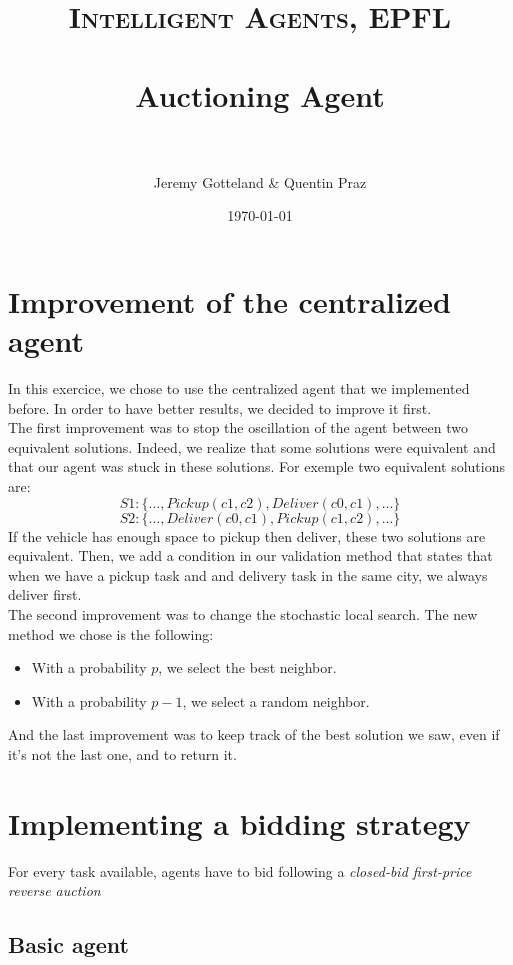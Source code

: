 \documentclass[fontsize=12pt]{scrartcl} %
\title{	
\normalfont \normalsize 
\textsc{Intelligent Agents, EPFL} \\ [20pt] %
\horrule{0.5pt} \\[0.4cm] %
\huge Auctioning Agent \\ %
\horrule{2pt} \\[0.5cm] %
}
\author{Jeremy Gotteland \& Quentin Praz} %
\date{\normalsize\today} %
\begin{document}
\maketitle %


\section*{Improvement of the centralized agent}

In this exercice, we chose to use the centralized agent that we implemented before. In order to have better results, we decided to improve it first.\\
The first improvement was to stop the oscillation of the agent between two equivalent solutions. Indeed, we realize that some solutions were equivalent and that our agent was stuck in these solutions. For exemple two equivalent solutions are:
$$S1: \{..., Pickup(c1, c2), Deliver(c0, c1),...\}$$ 
$$S2: \{..., Deliver(c0, c1), Pickup(c1, c2),...\}$$
If the vehicle has enough space to pickup then deliver, these two solutions are equivalent. Then, we add a condition in our validation method that states that when we have a pickup task and and delivery task in the same city, we always deliver first.\\
The second improvement was to change the stochastic local search. The new method we chose is the following:
\begin{itemize}
\item With a probability $p$, we select the best neighbor.
\item With a probability $p-1$, we select a random neighbor.
\end{itemize}
And the last improvement was to keep track of the best solution we saw, even if it's not the last one, and to return it.


\section*{Implementing a bidding strategy}

For every task available, agents have to bid following a \textit{closed-bid first-price reverse auction}


\subsection*{Basic agent}
\end{document}
